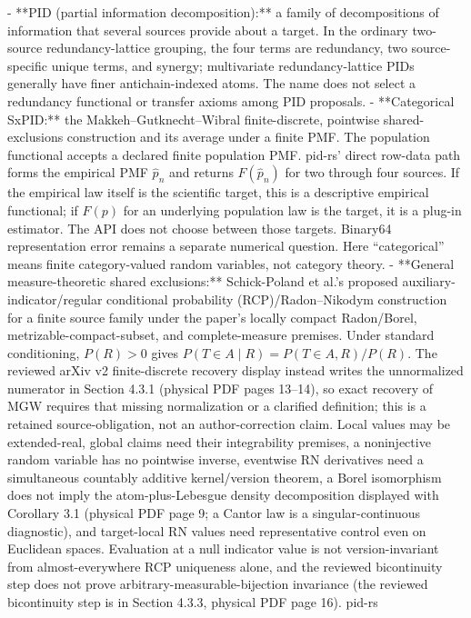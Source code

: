 \documentclass[11pt]{article}
\begin{document}
\begin{markdown}
- **PID (partial information decomposition):** a family of decompositions of information that
  several sources provide about a target. In the ordinary two-source redundancy-lattice grouping,
  the four terms are redundancy, two source-specific unique terms, and synergy; multivariate
  redundancy-lattice PIDs generally have finer antichain-indexed atoms. The name does not select a
  redundancy functional or transfer axioms among PID proposals.
- **Categorical SxPID:** the Makkeh--Gutknecht--Wibral finite-discrete, pointwise
  shared-exclusions construction and its average under a finite PMF. The population functional
  accepts a declared finite population PMF. pid-rs' direct row-data path forms the empirical PMF
  $\widehat p_n$ and returns $F(\widehat p_n)$ for two through four sources. If the empirical law
  itself is the scientific target, this is a descriptive empirical functional; if $F(p)$ for an
  underlying population law is the target, it is a plug-in estimator. The API does not choose
  between those targets. Binary64 representation error remains a separate numerical question. Here
  “categorical” means finite category-valued random variables, not category theory.
- **General measure-theoretic shared exclusions:** Schick-Poland et al.'s proposed
  auxiliary-indicator/regular conditional probability (RCP)/Radon--Nikodym construction for a
  finite source family under the paper's
  locally compact Radon/Borel, metrizable-compact-subset, and complete-measure premises. Under
  standard conditioning, $P(R)>0$ gives
  $P(T\in A\mid R)=P(T\in A,R)/P(R)$. The reviewed arXiv v2 finite-discrete recovery display instead
  writes the unnormalized numerator in Section 4.3.1 (physical PDF pages 13--14), so exact recovery
  of MGW requires that missing normalization or a clarified definition; this is a retained
  source-obligation, not an author-correction claim.
  Local values may be extended-real, global claims need their integrability premises, a
  noninjective random variable has no pointwise inverse, eventwise
  RN derivatives need a simultaneous countably additive kernel/version theorem, a Borel
  isomorphism does not imply the atom-plus-Lebesgue density decomposition displayed with Corollary
  3.1 (physical PDF page 9; a Cantor law is a singular-continuous diagnostic), and target-local RN
  values need representative control even on Euclidean spaces.
  Evaluation at a null indicator value is not version-invariant from almost-everywhere RCP
  uniqueness alone, and the reviewed bicontinuity step does not prove arbitrary-measurable-bijection
  invariance (the reviewed bicontinuity step is in Section 4.3.3, physical PDF page 16). pid-rs

\end{markdown}
\end{document}
